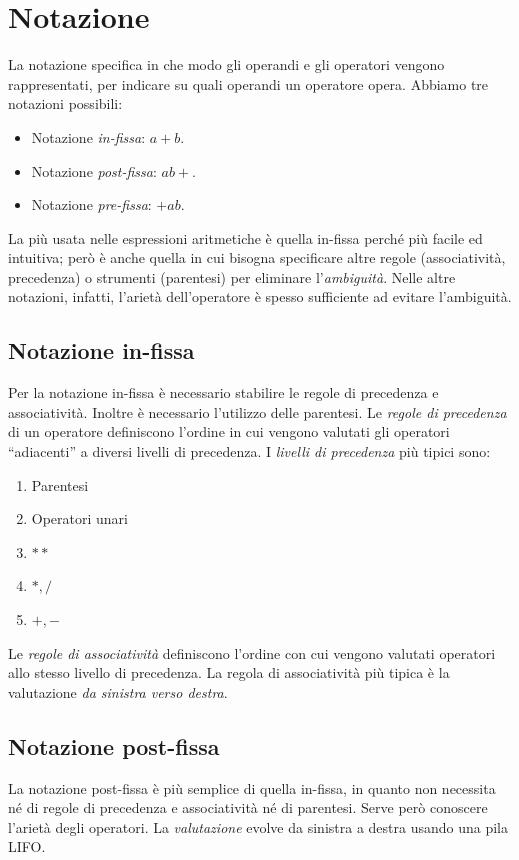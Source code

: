 \documentclass[a4paper,oneside,titlepage]{book}
\begin{document}
\section{Notazione}
La notazione specifica in che modo gli operandi e gli operatori vengono rappresentati, per indicare su quali operandi un operatore opera.
\newpage
\noindent
Abbiamo tre notazioni possibili:
\begin{itemize}
	\item Notazione \textit{in-fissa}: $a + b$.
	\item Notazione \textit{post-fissa}: $a b +$.
	\item Notazione \textit{pre-fissa}: $+ a b$.
\end{itemize}
La più usata nelle espressioni aritmetiche è quella in-fissa perché più facile ed intuitiva; però è anche quella in cui bisogna specificare altre regole (associatività, precedenza) o strumenti (parentesi) per eliminare l'\textit{ambiguità}. Nelle altre notazioni, infatti, l'arietà dell'operatore è spesso sufficiente ad evitare l'ambiguità.

\subsection{Notazione in-fissa}
Per la notazione in-fissa è necessario stabilire le regole di precedenza e associatività. Inoltre è necessario l'utilizzo delle parentesi. Le \textit{regole di precedenza} di un operatore definiscono l'ordine in cui vengono valutati gli operatori ``adiacenti'' a diversi livelli di precedenza. I \textit{livelli di precedenza} più tipici sono:
\begin{enumerate}
	\item Parentesi
	\item Operatori unari
	\item $**$
	\item $*,/$
	\item $+,-$
\end{enumerate}
Le \textit{regole di associatività} definiscono l'ordine con cui vengono valutati operatori allo stesso livello di precedenza. La regola di associatività più tipica è la valutazione \textit{da sinistra verso destra}.

\subsection{Notazione post-fissa}
La notazione post-fissa è più semplice di quella in-fissa, in quanto non necessita né di regole di precedenza e associatività né di parentesi. Serve però conoscere l'arietà degli operatori. La \textit{valutazione} evolve da sinistra a destra usando una pila LIFO.
\end{document}

